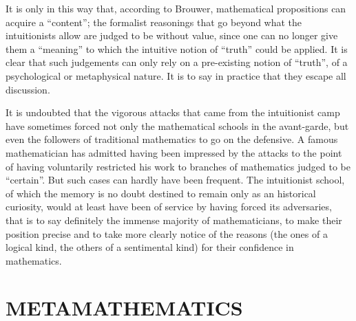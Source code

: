 It is only in this way that, according to Brouwer, mathematical propositions can acquire a ``content''; the formalist reasonings that go beyond what the intuitionists allow are judged to be without value, since one can no longer give them a ``meaning'' to which the intuitive notion of ``truth'' could be applied. It is clear that such judgements can only rely on a pre-existing notion of ``truth'', of a psychological or metaphysical nature. It is to say in practice that they escape all discussion.

It is undoubted that the vigorous attacks that came from the intuitionist camp have sometimes forced not only the mathematical schools in the avant-garde, but even the followers of traditional mathematics to go on the defensive. A famous mathematician has admitted having been impressed by the attacks to the point of having voluntarily restricted his work to branches of mathematics judged to be ``certain''. But such cases can hardly have been frequent. The intuitionist school, of which the memory is no doubt destined to remain only as an historical curiosity, would at least have been of service by having forced its adversaries, that is to say definitely the immense majority of mathematicians, to make their position precise and to take more clearly notice of the reasons (the ones of a logical kind, the others of a sentimental kind) for their confidence in mathematics.

\section*{METAMATHEMATICS}
{}


